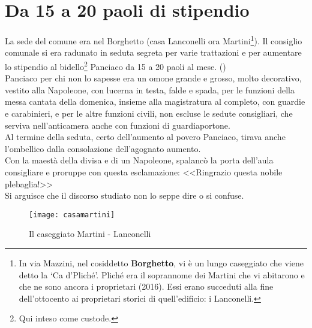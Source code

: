 
\chapter{Da 15 a 20 paoli di stipendio}
La sede del comune era nel Borghetto (casa Lanconelli ora Martini\footnote{In via Mazzini, nel cosiddetto \textbf{Borghetto}, vi è un lungo caseggiato che viene detto  la ‘Ca d'Pliché'. Pliché era il soprannome dei Martini che vi abitarono e che ne sono ancora i proprietari (2016). Essi erano succeduti alla fine dell'ottocento ai proprietari storici di quell'edificio: i Lanconelli.}). Il consiglio comunale si era radunato in seduta segreta per varie trattazioni e per aumentare lo stipendio al bidello\footnote{Qui inteso come custode.} Panciaco da 15 a 20 paoli al mese. (\Large {}\normalfont \normalsize \:)\\
\indent Panciaco per chi non lo sapesse era un omone grande e grosso, molto decorativo, vestito alla Napoleone, con lucerna in testa, falde e spada, per le funzioni della messa cantata della domenica, insieme alla magistratura al completo, con guardie e carabinieri, e per le altre funzioni civili, non escluse le sedute consigliari, che serviva nell'anticamera anche con funzioni di guardiaportone.\\
\indent Al termine della seduta, certo dell'aumento al povero Panciaco, tirava anche l'ombellico dalla consolazione dell'agognato aumento.\\
\indent Con la maestà della divisa e di un Napoleone, spalancò la porta dell'aula consigliare e proruppe con questa esclamazione: <<Ringrazio questa nobile plebaglia!>>\\
\indent Si arguisce che il discorso studiato non lo seppe dire o si confuse.

 \begin{figure}[htb]
    \centering
    \texttt{[image: casamartini]}
    \caption*{Il caseggiato Martini - Lanconelli\label{fig:casamartini}}
\end{figure}